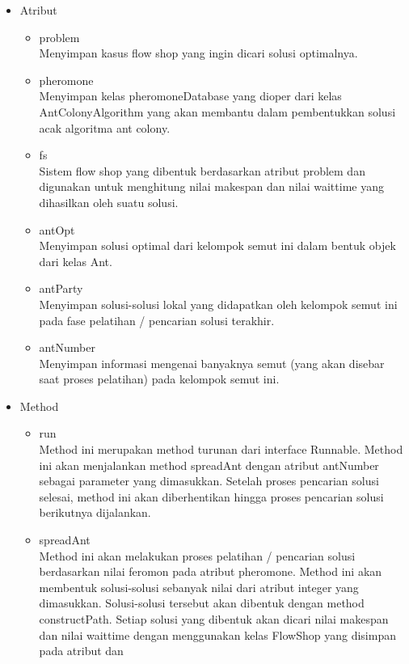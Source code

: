 \begin{itemize}
		\begin{itemize}
			\item Atribut
			\begin{itemize}
				\item problem \\
				Menyimpan kasus flow shop yang ingin dicari solusi optimalnya.
				\item pheromone \\
				Menyimpan kelas pheromoneDatabase yang dioper dari kelas AntColonyAlgorithm
				yang akan membantu dalam pembentukkan solusi acak algoritma ant colony.
				\item fs \\
				Sistem flow shop yang dibentuk berdasarkan atribut problem dan digunakan
				untuk menghitung nilai makespan dan nilai waittime yang dihasilkan oleh suatu solusi.
				\item antOpt \\
				Menyimpan solusi optimal dari kelompok semut ini dalam bentuk objek dari kelas
				Ant.
				\item antParty \\
				Menyimpan solusi-solusi lokal yang didapatkan oleh kelompok semut ini pada fase
				pelatihan / pencarian solusi terakhir.
				\item antNumber \\
				Menyimpan informasi mengenai banyaknya semut (yang akan disebar saat proses
				pelatihan) pada kelompok semut ini.
			\end{itemize}
			\item Method
			\begin{itemize}
				\item run \\
				Method ini merupakan method turunan dari interface Runnable. Method ini akan
				menjalankan method spreadAnt dengan atribut antNumber sebagai parameter yang
				dimasukkan. Setelah proses pencarian solusi selesai, method ini akan diberhentikan
				hingga proses pencarian solusi berikutnya dijalankan.
				\item spreadAnt \\
				Method ini akan melakukan proses pelatihan / pencarian solusi berdasarkan nilai
				feromon pada atribut pheromone. Method ini akan membentuk solusi-solusi sebanyak
				nilai dari atribut integer yang dimasukkan. Solusi-solusi tersebut akan dibentuk
				dengan method constructPath. Setiap solusi yang dibentuk akan dicari nilai makespan dan 
				nilai waittime dengan menggunakan kelas FlowShop yang disimpan pada atribut dan

\end{itemize}
\end{itemize}
\end{itemize}
